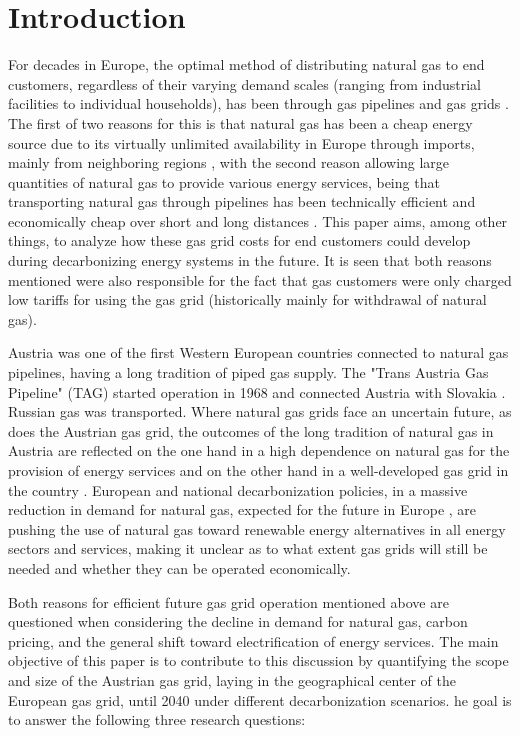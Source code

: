 \section{Introduction}
For decades in Europe, the optimal method of distributing natural gas to end customers, regardless of their varying demand scales (ranging from industrial facilities to individual households), has been through gas pipelines and gas grids \cite{rajnauth2008gas}. The first of two reasons for this is that natural gas has been a cheap energy source due to its virtually unlimited availability in Europe through imports, mainly from neighboring regions \cite{bilgin2009geopolitics}, with the second reason allowing large quantities of natural gas to provide various energy services, being that transporting natural gas through pipelines has been technically efficient and economically cheap over short and long distances \cite{thomas2003review}. This paper aims, among other things, to analyze how these gas grid costs for end customers could develop during decarbonizing energy systems in the future. It is seen that both reasons mentioned were also responsible for the fact that gas customers were only charged low tariffs for using the gas grid (historically mainly for withdrawal of natural gas).\vspace{0.3cm}
 
Austria was one of the first Western European countries connected to natural gas pipelines, having a long tradition of piped gas supply. The "Trans Austria Gas Pipeline" (TAG) started operation in 1968 and connected Austria with Slovakia \cite{gas_connect_austria}. Russian gas was transported. Where natural gas grids face an uncertain future, as does the Austrian gas grid, the outcomes of the long tradition of natural gas in Austria are reflected on the one hand in a high dependence on natural gas for the provision of energy services \cite{eurostat_natural_gas} and on the other hand in a well-developed gas grid in the country \cite{econtrol_grid}. European and national decarbonization policies, in a massive reduction in demand for natural gas, expected for the future in Europe \cite{repowereu}, are pushing the use of natural gas toward renewable energy alternatives in all energy sectors and services, making it unclear as to what extent gas grids will still be needed and whether they can be operated economically.\vspace{0.3cm}

Both reasons for efficient future gas grid operation mentioned above are questioned when considering the decline in demand for natural gas, carbon pricing, and the general shift toward electrification of energy services. The main objective of this paper is to contribute to this discussion by quantifying the scope and size of the Austrian gas grid, laying in the geographical center of the European gas grid, until 2040 under different decarbonization scenarios.  he goal is to answer the following three research questions:

